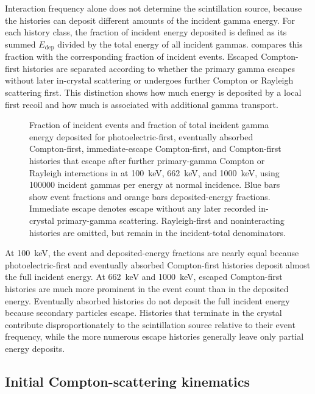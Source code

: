 Interaction frequency alone does not determine the scintillation source, because the histories can deposit different amounts of the incident gamma energy. For each history class, the fraction of incident energy deposited is defined as its summed $E_{\mathrm{dep}}$ divided by the total energy of all incident gammas.  compares this fraction with the corresponding fraction of incident events. Escaped Compton-first histories are separated according to whether the primary gamma escapes without later in-crystal scattering or undergoes further Compton or Rayleigh scattering first. This distinction shows how much energy is deposited by a local first recoil and how much is associated with additional gamma transport.

\begin{figure}[!htbp]
  \captionsetup{font=small}
  \centering
  \caption{Fraction of incident events and fraction of total incident gamma energy deposited for photoelectric-first, eventually absorbed Compton-first, immediate-escape Compton-first, and Compton-first histories that escape after further primary-gamma Compton or Rayleigh interactions in  at \qty{100}{\kilo\electronvolt}, \qty{662}{\kilo\electronvolt}, and \qty{1000}{\kilo\electronvolt}, using \num{100000} incident gammas per energy at normal incidence. Blue bars show event fractions and orange bars deposited-energy fractions. Immediate escape denotes escape without any later recorded in-crystal primary-gamma scattering. Rayleigh-first and noninteracting histories are omitted, but remain in the incident-total denominators.}
  \label{fig:event-energy-weight}
\end{figure}

At \qty{100}{\kilo\electronvolt}, the event and deposited-energy fractions are nearly equal because photoelectric-first and eventually absorbed Compton-first histories deposit almost the full incident energy. At \qty{662}{\kilo\electronvolt} and \qty{1000}{\kilo\electronvolt}, escaped Compton-first histories are much more prominent in the event count than in the deposited energy. Eventually absorbed histories do not deposit the full incident energy because secondary particles escape. Histories that terminate in the crystal contribute disproportionately to the scintillation source relative to their event frequency, while the more numerous escape histories generally leave only partial energy deposits.

\subsection{Initial Compton-scattering kinematics}

